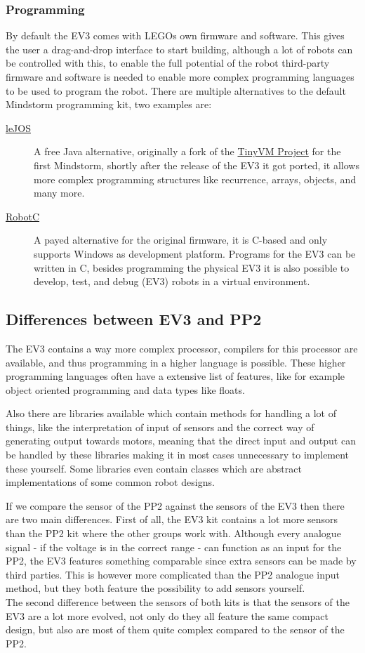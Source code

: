\subsubsection{Programming}
By default the EV3 comes with LEGOs own firmware and software. This gives the user a drag-and-drop interface to start building, although a lot of robots can be controlled with this, to enable the full potential of the robot third-party firmware and software is needed to enable more complex programming languages to be used to program the robot. There are multiple alternatives to the default Mindstorm programming kit, two examples are:
	\begin{description}
		\item[\href{http://www.lejos.org/}{leJOS}] A free Java alternative, originally a fork of the \href{http://tinyvm.sourceforge.net/}{TinyVM Project} for the first Mindstorm, shortly after the release of the EV3 it got ported, it allows more complex programming structures like recurrence, arrays, objects, and many more.
		\item[\href{http://www.robotc.net/}{RobotC}] A payed alternative for the original firmware, it is C-based and only supports Windows as development platform. Programs for the EV3 can be written in C, besides programming the physical EV3 it is also possible to develop, test, and debug (EV3) robots in a virtual environment.
	\end{description}

\newpage
\subsection{Differences between EV3 and PP2} 
The EV3 contains a way more complex processor, compilers for this processor are available, and thus programming in a higher language is possible. These higher programming languages often have a extensive list of features, like for example object oriented programming and data types like floats.

Also there are libraries available which contain methods for handling a lot of things, like the interpretation of input of sensors and the correct way of generating output towards motors, meaning that the direct input and output can be handled by these libraries making it in most cases unnecessary to implement these yourself. Some libraries even contain classes which are abstract implementations of some common robot designs.

If we compare the sensor of the PP2 against the sensors of the EV3 then there are two main differences. First of all, the EV3 kit contains a lot more sensors than the PP2 kit where the other groups work with. Although every analogue signal - if the voltage is in the correct range - can function as an input for the PP2, the EV3 features something comparable since extra sensors can be made by third parties. This is however more complicated than the PP2 analogue input method, but they both feature the possibility to add sensors yourself. \\ 
The second difference between the sensors of both kits is that the sensors of the EV3 are a lot more evolved, not only do they all feature the same compact design, but also are most of them quite complex compared to the sensor of the PP2.

